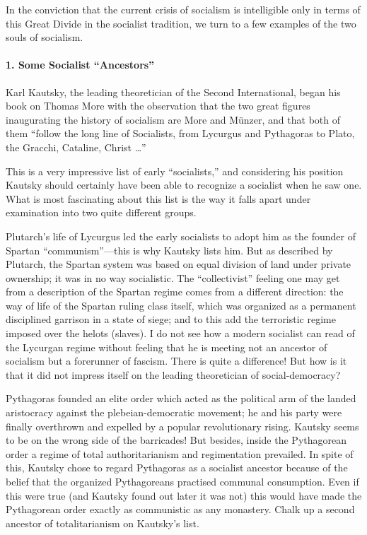 In the conviction that the current crisis of socialism is intelligible only in terms of this Great Divide in the socialist tradition, we turn to a few examples of the two souls of socialism.

\paragraph{1. Some Socialist ``Ancestors''}

Karl Kautsky, the leading theoretician of the Second International, began his book on Thomas More with the observation that the two great figures inaugurating the history of socialism are More and M\"{u}nzer, and that both of them ``follow the long line of Socialists, from Lycurgus and Pythagoras to Plato, the Gracchi, Cataline, Christ \ldots''

This is a very impressive list of early ``socialists,'' and considering his position Kautsky should certainly have been able to recognize a socialist when he saw one. What is most fascinating about this list is the way it falls apart under examination into two quite different groups.

Plutarch's life of Lycurgus led the early socialists to adopt him as the founder of Spartan ``communism''---this is why Kautsky lists him. But as described by Plutarch, the Spartan system was based on equal division of land under private ownership; it was in no way socialistic. The ``collectivist'' feeling one may get from a description of the Spartan regime comes from a different direction: the way of life of the Spartan ruling class itself, which was organized as a permanent disciplined garrison in a state of siege; and to this add the terroristic regime imposed over the helots (slaves). I do not see how a modern socialist can read of the Lycurgan regime without feeling that he is meeting not an ancestor of socialism but a forerunner of fascism. There is quite a difference! But how is it that it did not impress itself on the leading theoretician of social-democracy?

Pythagoras founded an elite order which acted as the political arm of the landed aristocracy against the plebeian-democratic movement; he and his party were finally overthrown and expelled by a popular revolutionary rising. Kautsky seems to be on the wrong side of the barricades! But besides, inside the Pythagorean order a regime of total authoritarianism and regimentation prevailed. In spite of this, Kautsky chose to regard Pythagoras as a socialist ancestor because of the belief that the organized Pythagoreans practised communal consumption. Even if this were true (and Kautsky found out later it was not) this would have made the Pythagorean order exactly as communistic as any monastery. Chalk up a second ancestor of totalitarianism on Kautsky's list.

